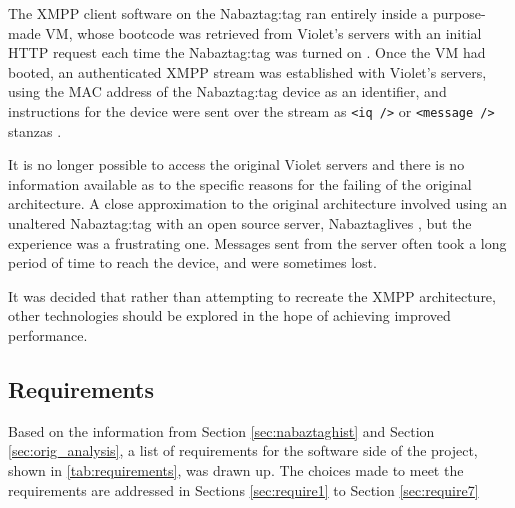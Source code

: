 \documentclass[12pt, a4paper]{article}
\begin{document}
	The \ac{XMPP} client software on the Nabaztag:tag ran entirely inside a purpose-made \ac{VM}, whose bootcode was retrieved from Violet's servers with an initial \ac{HTTP} request each time the Nabaztag:tag was turned on \parencite{nabaztagsoftwaredissection}. Once the \ac{VM} had booted, an authenticated \ac{XMPP} stream was established with Violet's servers, using the \ac{MAC} address of the Nabaztag:tag device as an identifier, and instructions for the device were sent over the stream as \verb+<iq />+ or \verb+<message />+ stanzas \parencite{nabaztagsoftwaredissection}.
	
	It is no longer possible to access the original Violet servers and there is no information available as to the specific reasons for the failing of the original architecture. A close approximation to the original architecture involved using an unaltered Nabaztag:tag with an open source server, Nabaztaglives \parencite{nabaztaglives}, but the experience was a frustrating one. Messages sent from the server often took a long period of time to reach the device, and were sometimes lost.
  
  It was decided that rather than attempting to recreate the \ac{XMPP} architecture, other technologies should be explored in the hope of achieving improved performance.
  			
\subsection{Requirements}

Based on the information from Section \ref{sec:nabaztaghist} and Section \ref{sec:orig_analysis}, a list of requirements for the software side of the project, shown in \autoref{tab:requirements}, was drawn up. The choices made to meet the requirements are addressed in Sections \ref{sec:require1} to Section \ref{sec:require7}
\end{document}
